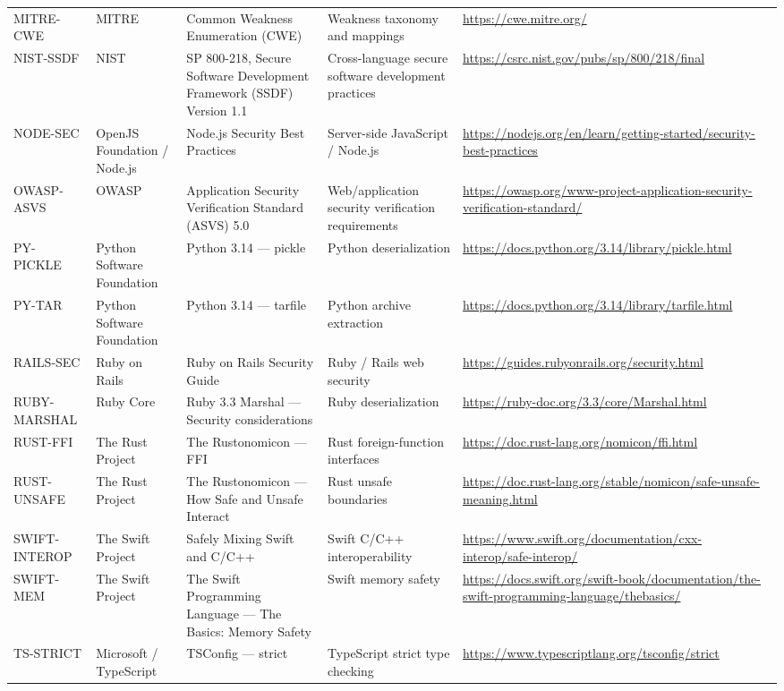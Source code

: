 \documentclass[10pt,letterpaper]{article}
\begin{document}
\begin{landscape}
\begin{longtable}{@{}P{0.82in}P{1.23in}P{2.25in}P{1.7in}P{3.0in}@{}}
MITRE-CWE & MITRE & Common Weakness Enumeration (CWE) & Weakness taxonomy and mappings & \url{https://cwe.mitre.org/}\\
NIST-SSDF & NIST & SP 800-218, Secure Software Development Framework (SSDF) Version 1.1 & Cross-language secure software development practices & \url{https://csrc.nist.gov/pubs/sp/800/218/final}\\
NODE-SEC & OpenJS Foundation / Node.js & Node.js Security Best Practices & Server-side JavaScript / Node.js & \url{https://nodejs.org/en/learn/getting-started/security-best-practices}\\
OWASP-ASVS & OWASP & Application Security Verification Standard (ASVS) 5.0 & Web/application security verification requirements & \url{https://owasp.org/www-project-application-security-verification-standard/}\\
PY-PICKLE & Python Software Foundation & Python 3.14 --- pickle & Python deserialization & \url{https://docs.python.org/3.14/library/pickle.html}\\
PY-TAR & Python Software Foundation & Python 3.14 --- tarfile & Python archive extraction & \url{https://docs.python.org/3.14/library/tarfile.html}\\
RAILS-SEC & Ruby on Rails & Ruby on Rails Security Guide & Ruby / Rails web security & \url{https://guides.rubyonrails.org/security.html}\\
RUBY-MARSHAL & Ruby Core & Ruby 3.3 Marshal --- Security considerations & Ruby deserialization & \url{https://ruby-doc.org/3.3/core/Marshal.html}\\
RUST-FFI & The Rust Project & The Rustonomicon --- FFI & Rust foreign-function interfaces & \url{https://doc.rust-lang.org/nomicon/ffi.html}\\
RUST-UNSAFE & The Rust Project & The Rustonomicon --- How Safe and Unsafe Interact & Rust unsafe boundaries & \url{https://doc.rust-lang.org/stable/nomicon/safe-unsafe-meaning.html}\\
SWIFT-INTEROP & The Swift Project & Safely Mixing Swift and C/C++ & Swift C/C++ interoperability & \url{https://www.swift.org/documentation/cxx-interop/safe-interop/}\\
SWIFT-MEM & The Swift Project & The Swift Programming Language --- The Basics: Memory Safety & Swift memory safety & \url{https://docs.swift.org/swift-book/documentation/the-swift-programming-language/thebasics/}\\
TS-STRICT & Microsoft / TypeScript & TSConfig --- strict & TypeScript strict type checking & \url{https://www.typescriptlang.org/tsconfig/strict}\\
\bottomrule
\end{longtable}
\normalsize
\end{landscape}
\end{document}
